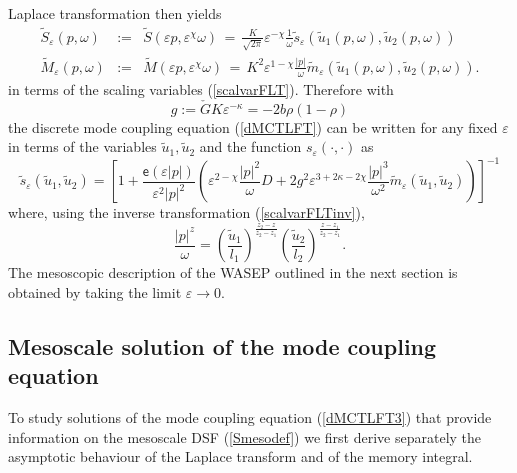 \documentclass[12pt]{article}
\begin{document}
Laplace transformation then yields
\begin{eqnarray}
\tilde{S}_{\varepsilon}(p,\omega) & := &
\tilde{S}(\varepsilon p, \varepsilon^{\chi} \omega) \, = \, \frac{K}{\sqrt{2\pi}} \varepsilon^{-\chi} \frac{1}{\omega} 
\tilde{s}_{\varepsilon}(\tilde{u}_1(p,\omega),\tilde{u}_2(p,\omega))
\label{tDSFeps} \\
\tilde{M}_{\varepsilon}(p,\omega) & := &
\tilde{M}(\varepsilon p, \varepsilon^{\chi} \omega) \, = \, K^2 \varepsilon^{1-\chi} \frac{|p|}{\omega}
\tilde{m}_{\varepsilon}(\tilde{u}_1(p,\omega),\tilde{u}_2(p,\omega)).
\label{tmemeps}
\end{eqnarray}
in terms of the scaling variables (\ref{scalvarFLT}).
Therefore with
\begin{equation}
g := \check{G} K \varepsilon^{-\kappa}
= -2 b \rho(1-\rho)
\end{equation}
the discrete mode coupling
equation (\ref{dMCTLFT}) can be written for any fixed $\varepsilon$ in terms of the 
variables $\tilde{u}_1, \tilde{u}_2$ and the function $s_\varepsilon(\cdot,\cdot)$ as
\begin{equation}
\tilde{s}_{\varepsilon}(\tilde{u}_1,\tilde{u}_2)
= \left[1
+ \frac{\mathsf{e}(\varepsilon |p|)}{\varepsilon^2 |p|^2}
\left(\varepsilon^{2-\chi} \frac{|p|^2}{\omega} D  
+ 2 g^2  \varepsilon^{3+2\kappa-2\chi} \frac{|p|^3}{\omega^2}
\tilde{m}_{\varepsilon}(\tilde{u}_1,\tilde{u}_2)
\right)\right]^{-1}
\label{dMCTLFT3}
\end{equation}
where, using the inverse transformation (\ref{scalvarFLTinv}),
\begin{equation}
\frac{|p|^z}{\omega}
= 
\left(\frac{\tilde{u}_1}{l_1}
\right)^{\frac{z_2-z}{z_2-z_1}}
\left(\frac{\tilde{u}_2}{l_2} \right)^{\frac{z-z_1}{z_2-z_1}}.
\label{pzo}
\end{equation}
The mesoscopic description of the WASEP outlined in the next section
is obtained by taking the limit $\varepsilon\to 0$.

\subsection{Mesoscale solution of the mode coupling equation}

To study solutions of the mode coupling equation (\ref{dMCTLFT3})
that provide information on the mesoscale DSF (\ref{Smesodef})
we first derive separately the asymptotic behaviour of the
Laplace transform and of the memory integral.
\end{document}

